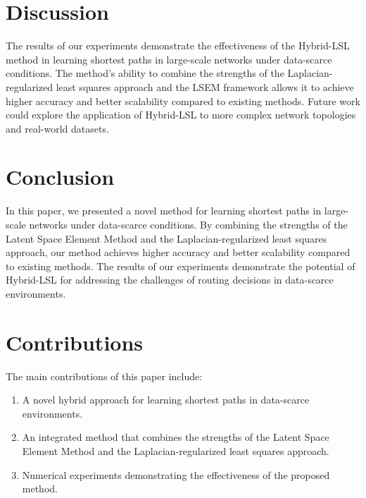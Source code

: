 \documentclass[11pt]{article}
\begin{document}
\section{Discussion}
The results of our experiments demonstrate the effectiveness of the Hybrid-LSL method in learning shortest paths in large-scale networks under data-scarce conditions. The method's ability to combine the strengths of the Laplacian-regularized least squares approach and the LSEM framework allows it to achieve higher accuracy and better scalability compared to existing methods. Future work could explore the application of Hybrid-LSL to more complex network topologies and real-world datasets.

\section{Conclusion}
In this paper, we presented a novel method for learning shortest paths in large-scale networks under data-scarce conditions. By combining the strengths of the Latent Space Element Method and the Laplacian-regularized least squares approach, our method achieves higher accuracy and better scalability compared to existing methods. The results of our experiments demonstrate the potential of Hybrid-LSL for addressing the challenges of routing decisions in data-scarce environments.

\section{Contributions}
The main contributions of this paper include:
\begin{enumerate}
    \item A novel hybrid approach for learning shortest paths in data-scarce environments.
    \item An integrated method that combines the strengths of the Latent Space Element Method and the Laplacian-regularized least squares approach.
    \item Numerical experiments demonstrating the effectiveness of the proposed method.
\end{enumerate}
\end{document}
